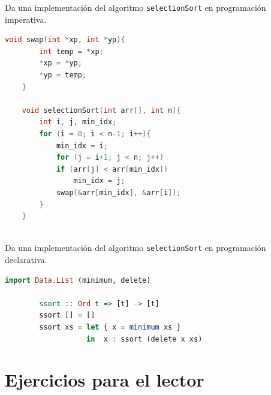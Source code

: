     \bigskip



    \bigskip
    \bigskip

    \begin{exercise}
        Da una implementación del algoritmo \texttt{selectionSort} en programación imperativa.

	\begin{lstlisting}[language=C++]
	void swap(int *xp, int *yp){
	    int temp = *xp;
	    *xp = *yp;
	    *yp = temp;
	}
	 
	void selectionSort(int arr[], int n){
	    int i, j, min_idx;
	    for (i = 0; i < n-1; i++){
	        min_idx = i;
	        for (j = i+1; j < n; j++)
	        if (arr[j] < arr[min_idx])
	            min_idx = j;
	        swap(&arr[min_idx], &arr[i]);
	    }
	}
	 
	\end{lstlisting}
    \end{exercise}

    \begin{exercise}
        Da una implementación del algoritmo \texttt{selectionSort} en programación declarativa.
	\begin{lstlisting}[language=Haskell] import Data.List (minimum, delete)

		ssort :: Ord t => [t] -> [t]
		ssort [] = []
		ssort xs = let { x = minimum xs } 
		           in  x : ssort (delete x xs)
	\end{lstlisting}
    \end{exercise}


\section{Ejercicios para el lector}

